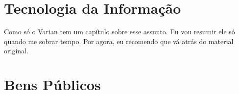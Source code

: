 \documentclass[a4paper,11pt,oneside]{book}
\theoremstyle{definition}
\theoremstyle{break}
\begin{document}
\chapter{Tecnologia da Informação}

Como só o Varian tem um capítulo sobre esse assunto. Eu vou resumir ele só quando me sobrar tempo. Por agora, eu recomendo que vá atrás do material original.


\chapter{Bens Públicos}
\end{document}
